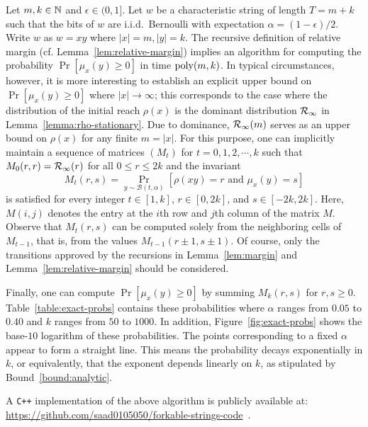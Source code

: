 Let $m, k \in \mathbb{N}$  and $\epsilon \in (0,1]$. 
Let $w$ be a characteristic string of length $T = m + k$ such that 
the bits of $w$ are i.i.d.\ Bernoulli with expectation $\alpha = (1 - \epsilon)/2$. 
Write $w$ as $w = xy$ where $|x| = m, |y| = k$.
The recursive definition of relative margin (cf. Lemma~\ref{lem:relative-margin}) 
implies an algorithm for computing the probability
$\Pr[\mu_x(y) \geq 0]$ in time $\mathrm{poly}(m, k)$. In typical
circumstances, however, it is more interesting to establish an
explicit upper bound on $\Pr[\mu_x(y) \geq 0]$ where
$|x| \rightarrow \infty$; this corresponds to the case where the
distribution of the initial reach $\rho(x)$ is the dominant distribution
$\mathcal{R}_\infty$ in Lemma~\ref{lemma:rho-stationary}. 
Due to dominance, $\mathcal{R}_\infty(m)$ serves as an
upper bound on $\rho(x)$ for any finite $m = |x|$. 
For this purpose, one can implicitly
maintain a sequence of matrices $\left( M_t \right)$ for $t = 0, 1, 2, \cdots, k$
such that $M_0(r, r) = \mathcal{R}_\infty(r)$ for all $0 \leq r \leq 2k$ and
the invariant
\[
  M_t(r, s) = \Pr_{y \sim \mathcal{B}(t, \alpha)}[\rho(xy) = r \text{ and }
  \mu_x(y) = s ]
\]
is satisfied for every integer $t \in [1, k]$,
$r \in [0, 2k]$, and $s \in [-2k, 2k]$. 
Here, $M(i,j)$ denotes the entry at the $i$th row and $j$th column of the matrix $M$.
Observe that $M_t(r,s)$ can be computed solely from the neighboring cells of $M_{t-1}$, that is, 
from the values $M_{t-1}(r\pm 1, s \pm 1)$. 
Of course, only the transitions approved by the recursions in 
Lemma~\ref{lem:margin} and Lemma~\ref{lem:relative-margin} should be considered.

Finally, one can compute $\Pr[\mu_x(y) \geq 0]$ by summing $M_k(r,s)$ for
$r, s \geq 0$. Table~\ref{table:exact-probs} contains these
probabilities where $\alpha$ ranges from $0.05$ to $0.40$ and $k$
ranges from $50$ to $1000$. 
In addition, Figure~\ref{fig:exact-probs} shows the base-$10$ logarithm of
these probabilities. The
points corresponding to a fixed $\alpha$ appear to form a straight
line. This means the probability decays exponentially in $k$, or equivalently, that the exponent 
depends linearly on $k$, 
as stipulated by Bound~\ref{bound:analytic}. 

A \texttt{C++} implementation of the above algorithm is publicly available 
at: \\
\href{https://github.com/saad0105050/forkable-strings-code}{https://github.com/saad0105050/forkable-strings-code}~\cite{PrForkableCode}.



